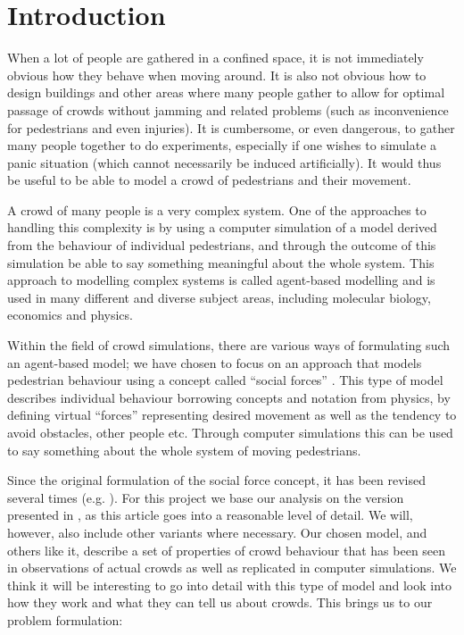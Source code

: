 \section{Introduction}
When a lot of people are gathered in a confined space, it is not immediately 
obvious how they behave when moving around. It is also not obvious how to 
design buildings and other areas where many people gather to allow for optimal 
passage of crowds without jamming and related problems (such as inconvenience 
for pedestrians and even injuries). It is cumbersome, or even dangerous, to 
gather many people together to do experiments, especially if one wishes to 
simulate a panic situation (which cannot necessarily be induced artificially).  
It would thus be useful to be able to model a crowd of pedestrians and their 
movement.

A crowd of many people is a very complex system. One of the approaches to 
handling this complexity is by using a computer simulation of a model derived 
from the behaviour of individual pedestrians, and through the outcome of this 
simulation be able to say something meaningful about the whole system. This 
approach to modelling complex systems is called agent-based modelling and is 
used in many different and diverse subject areas, including molecular biology, 
economics and physics.

Within the field of crowd simulations, there  are various ways of formulating 
such an agent-based model; we have chosen to focus on an approach that models 
pedestrian behaviour using a concept called ``social forces'' 
\cite{social-force}. This type of model describes individual behaviour 
borrowing concepts and notation from physics, by defining  virtual ``forces'' 
representing desired movement as well as the tendency to avoid obstacles, 
other people etc. Through computer simulations this can be used to say 
something about the whole system of moving pedestrians.

Since the original formulation of the social force concept, it has been 
revised several times (e.g.  \cite{helbing00}). For this project we base our 
analysis on the  version presented in \cite{self-org}, as this article goes 
into a reasonable level of detail. We will, however, also include other 
variants where necessary.  Our chosen model, and others like it, describe a 
set of properties of crowd behaviour that has been seen in observations of 
actual crowds as well as replicated in computer simulations.  We think it will 
be interesting to go into detail with this type of model and look into how 
they work and what they can tell us about crowds. This brings us to our 
problem formulation:

